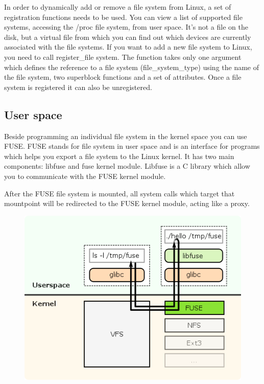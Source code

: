         In order to dynamically add or remove a file system from Linux, a set of registration functions needs to be used. You can view a list of supported file systems, accessing the /proc file system, from user space. It's not a file on the disk, but a virtual file from which you can find out which devices are currently associated with the file systems. If you want to add a new file system to Linux, you need to call register\_file system. The function takes only one argument which defines the reference to a file system (file\_system\_type) using the name of the file system, two superblock functions and a set of attributes. Once a file system is registered it can also be unregistered.

    \subsection{User space}
        Beside programming an individual file system in the kernel space you can use FUSE. FUSE stands for file system in user space and is an interface for programs which helps you export a file system to the Linux kernel. It has two main components: libfuse and fuse kernel module. Libfuse is a C library which allow you to communicate with the FUSE kernel module.
        
        After the FUSE file system is mounted, all system calls which target that mountpoint will be redirected to the FUSE kernel module, acting like a proxy.
        
        \begin{figure}[h]
           \begin{center}
               \includegraphics[width=15cm]{theoretical/fuse.png}
            \end{center}
        \end{figure}
         
